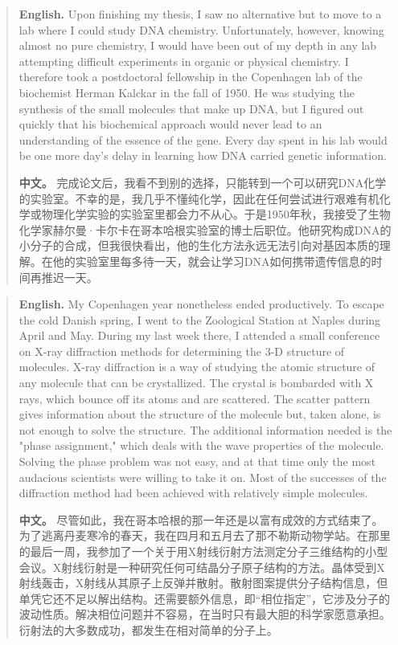 \begin{quote}
\noindent\textbf{English.} Upon finishing my thesis, I saw no alternative but to move to a lab where I could study DNA chemistry. Unfortunately, however, knowing almost no pure chemistry, I would have been out of my depth in any lab attempting difficult experiments in organic or physical chemistry. I therefore took a postdoctoral fellowship in the Copenhagen lab of the biochemist Herman Kalckar in the fall of 1950. He was studying the synthesis of the small molecules that make up DNA, but I figured out quickly that his biochemical approach would never lead to an understanding of the essence of the gene. Every day spent in his lab would be one more day's delay in learning how DNA carried genetic information.

\smallskip
\noindent\textbf{中文。} 完成论文后，我看不到别的选择，只能转到一个可以研究DNA化学的实验室。不幸的是，我几乎不懂纯化学，因此在任何尝试进行艰难有机化学或物理化学实验的实验室里都会力不从心。于是1950年秋，我接受了生物化学家赫尔曼·卡尔卡在哥本哈根实验室的博士后职位。他研究构成DNA的小分子的合成，但我很快看出，他的生化方法永远无法引向对基因本质的理解。在他的实验室里每多待一天，就会让学习DNA如何携带遗传信息的时间再推迟一天。
\end{quote}

\begin{quote}
\noindent\textbf{English.} My Copenhagen year nonetheless ended productively. To escape the cold Danish spring, I went to the Zoological Station at Naples during April and May. During my last week there, I attended a small conference on X-ray diffraction methods for determining the 3-D structure of molecules. X-ray diffraction is a way of studying the atomic structure of any molecule that can be crystallized. The crystal is bombarded with X rays, which bounce off its atoms and are scattered. The scatter pattern gives information about the structure of the molecule but, taken alone, is not enough to solve the structure. The additional information needed is the "phase assignment," which deals with the wave properties of the molecule. Solving the phase problem was not easy, and at that time only the most audacious scientists were willing to take it on. Most of the successes of the diffraction method had been achieved with relatively simple molecules.

\smallskip
\noindent\textbf{中文。} 尽管如此，我在哥本哈根的那一年还是以富有成效的方式结束了。为了逃离丹麦寒冷的春天，我在四月和五月去了那不勒斯动物学站。在那里的最后一周，我参加了一个关于用X射线衍射方法测定分子三维结构的小型会议。X射线衍射是一种研究任何可结晶分子原子结构的方法。晶体受到X射线轰击，X射线从其原子上反弹并散射。散射图案提供分子结构信息，但单凭它还不足以解出结构。还需要额外信息，即“相位指定”，它涉及分子的波动性质。解决相位问题并不容易，在当时只有最大胆的科学家愿意承担。衍射法的大多数成功，都发生在相对简单的分子上。
\end{quote}

